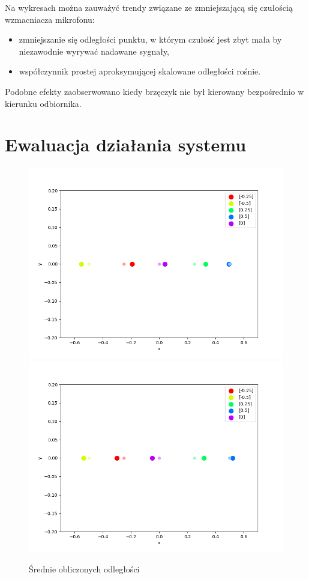 Na wykresach można zauważyć trendy związane ze zmniejszającą się czułością wzmacniacza mikrofonu:

\begin{itemize}
    \item zmniejszanie się odległości punktu, w którym czułość jest zbyt mała by niezawodnie wyrywać nadawane sygnały,
    \item współczynnik prostej aproksymującej skalowane odległości rośnie.
\end{itemize}

Podobne efekty zaobserwowano kiedy brzęczyk nie był kierowany bezpośrednio w kierunku odbiornika.



\section{Ewaluacja działania systemu}

\begin{figure}[h]
\centering
    \includegraphics[width=.49\textwidth]{pics/mult_lat_1d/positions_2_mean.png}
    \includegraphics[width=.49\textwidth]{pics/mult_lat_1d/positions_4_mean.png}
\caption{Średnie obliczonych odległości}
\end{figure}

